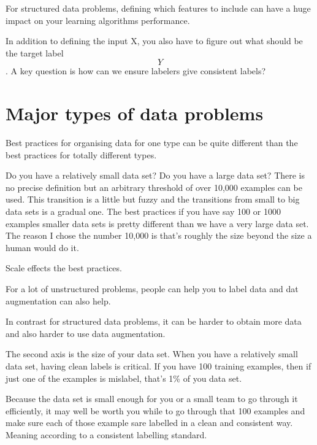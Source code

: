 For structured data problems, defining which features to include can have a huge impact on your learning algorithms performance.

In addition to defining the input X, you also have to figure out what should be the target label $$Y$$.
A key question is how can we ensure labelers give consistent labels?

\section{Major types of data problems}

Best practices for organising data for one type can be quite different than the best practices for totally different types.


Do you have a relatively small data set?
Do you have a large data set?
There is no precise definition but an arbitrary threshold of over 10,000 examples can be used.
This transition is a little but fuzzy and the transitions from small to big data sets is a gradual one.
The best practices if you have say 100 or 1000 examples smaller data sets is pretty different than we have a very large data set.
The reason I chose the number 10,000 is that's roughly the size beyond the size a human would do it.

Scale effects the best practices.

For a lot of unstructured problems, people can help you to label data and dat augmentation can also help.

In contrast for structured data problems, it can be harder to obtain more data and also harder to use data augmentation.


The second axis is the size of your data set.
When you have a relatively small data set, having clean labels is critical.
If you have 100 training examples, then if just one of the examples is mislabel, that's 1\% of you data set.

Because the data set is small enough for you or a small team to go through it efficiently, it may well be worth you while to go through that 100 examples and make sure each of those example sare labelled in a clean and consistent way.
Meaning according to a consistent labelling standard.

